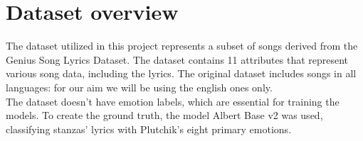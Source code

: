 
\chapter{Dataset overview}
\label{ch:capitolo1}

The dataset utilized in this project represents a subset of songs
derived from the Genius Song Lyrics Dataset\textsuperscript{\cite{geniusdataset}}.
The dataset contains 11 attributes
that represent various song data, including the lyrics.
The original dataset includes songs in all languages: for our aim
we will be using the english ones only.\\

The dataset doesn't have emotion labels, which are essential for training the models.
To create the ground truth, the model
Albert Base v2\textsuperscript{\cite{albert-base-v2}} was used, classifying
stanzas' lyrics with Plutchik's eight primary emotions.

